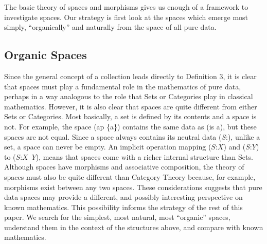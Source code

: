 \documentclass[11pt]{article}
\begin{document}
The basic theory of spaces and morphisms gives us enough of a framework to investigate spaces.  Our strategy is first look at the spaces which emerge most 
simply, ``organically'' and naturally from the space of all pure data.

\subsection{Organic Spaces}

   Since the general concept of a collection leads directly to Definition 3, it is clear that spaces must play a fundamental role 
in the mathematics of pure data, perhaps in a way analogous to the role that Sets or Categories play in classical mathematics. However, it is also 
clear that spaces are quite different from either Sets or Categories.  Most basically, a set is defined by its contents and a space is not.  For example,
the space (ap \{a\}) contains the same data as (is a), but these spaces are not equal.  
Since a space always contains its neutral data ($S$:), unlike a set, a space can never be empty.  An implicit operation mapping 
($S$:$X$) and ($S$:$Y$) to ($S$:$X$\ $Y$), means that spaces come with a richer internal structure than Sets.  
Although spaces have morphisms and associative composition, the theory of spaces must also be quite different than Category Theory because, for example, morphisms exist 
between any two spaces.  
These considerations suggests that pure data spaces may provide a different, and possibly interesting perspective on known mathematics.  
This possibility informs the strategy of the rest of this paper.  We 
search for the simplest, most natural, most ``organic'' spaces, understand them in the context of the structures above, and compare with known mathematics.  
\end{document}
